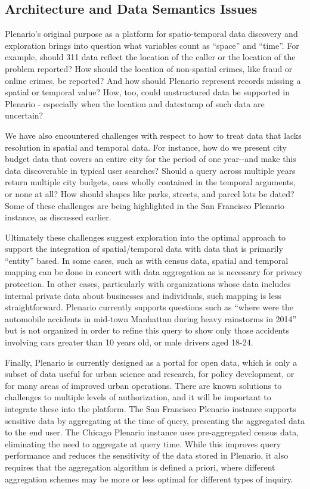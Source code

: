 \documentclass[11pt]{article}
\begin{document}
\subsection{\textbf{Architecture and Data Semantics Issues}}
Plenario's original purpose as a platform for spatio-temporal data discovery and exploration brings into question what variables count as ``space'' and ``time''. For example, should 311 data reflect the location of the caller or the location of the problem reported? How should the location of non-spatial crimes, like fraud or online crimes, be reported? And how should Plenario represent records missing a spatial or temporal value? How, too, could unstructured data be supported in Plenario - especially when the location and datestamp of such data are uncertain?

We have also encountered challenges with respect to how to treat data that lacks resolution in spatial and temporal data. For instance, how do we present city budget data that covers an entire city for the period of one year-{}-and make this data discoverable in typical user searches? Should a query across multiple years return multiple city budgets, ones wholly contained in the temporal arguments, or none at all? How should shapes like parks, streets, and parcel lots be dated? Some of these challenges are being highlighted in the San Francisco Plenario instance, as discussed earlier.

Ultimately these challenges suggest exploration into the optimal approach to support the integration of spatial/temporal data with data that is primarily ``entity'' based. In some cases, such as with census data, spatial and temporal mapping can be done in concert with data aggregation as is necessary for privacy protection. In other cases, particularly with organizations whose data includes internal private data about businesses and individuals, such mapping is less straightforward. Plenario currently supports questions such as ``where were the automobile accidents in mid-town Manhattan during heavy rainstorms in 2014'' but is not organized in order to refine this query to show only those accidents involving cars greater than 10 years old, or male drivers aged 18-24.

Finally, Plenario is currently designed as a portal for open data, which is only a subset of data useful for urban science and research, for policy development, or for many areas of improved urban operations. There are known solutions to challenges to multiple levels of authorization, and it will be important to integrate these into the platform. The San Francisco Plenario instance supports sensitive data by aggregating at the time of query, presenting the aggregated data to the end user. The Chicago Plenario instance uses pre-aggregated census data, eliminating the need to aggregate at query time. While this improves query performance and reduces the sensitivity of the data stored in Plenario, it also requires that the aggregation algorithm is defined a priori, where different aggregation schemes may be more or less optimal for different types of inquiry.
\end{document}

